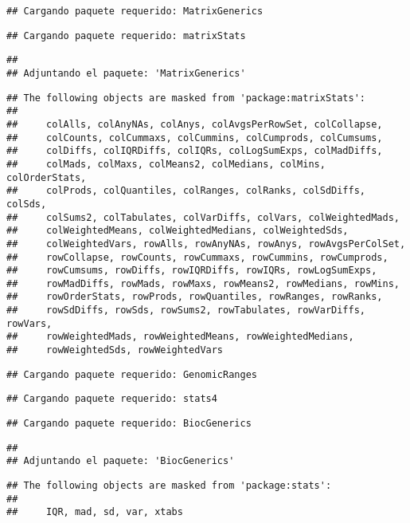 \documentclass[
]{article}
\begin{document}
\begin{verbatim}
## Cargando paquete requerido: MatrixGenerics
\end{verbatim}

\begin{verbatim}
## Cargando paquete requerido: matrixStats
\end{verbatim}

\begin{verbatim}
## 
## Adjuntando el paquete: 'MatrixGenerics'
\end{verbatim}

\begin{verbatim}
## The following objects are masked from 'package:matrixStats':
## 
##     colAlls, colAnyNAs, colAnys, colAvgsPerRowSet, colCollapse,
##     colCounts, colCummaxs, colCummins, colCumprods, colCumsums,
##     colDiffs, colIQRDiffs, colIQRs, colLogSumExps, colMadDiffs,
##     colMads, colMaxs, colMeans2, colMedians, colMins, colOrderStats,
##     colProds, colQuantiles, colRanges, colRanks, colSdDiffs, colSds,
##     colSums2, colTabulates, colVarDiffs, colVars, colWeightedMads,
##     colWeightedMeans, colWeightedMedians, colWeightedSds,
##     colWeightedVars, rowAlls, rowAnyNAs, rowAnys, rowAvgsPerColSet,
##     rowCollapse, rowCounts, rowCummaxs, rowCummins, rowCumprods,
##     rowCumsums, rowDiffs, rowIQRDiffs, rowIQRs, rowLogSumExps,
##     rowMadDiffs, rowMads, rowMaxs, rowMeans2, rowMedians, rowMins,
##     rowOrderStats, rowProds, rowQuantiles, rowRanges, rowRanks,
##     rowSdDiffs, rowSds, rowSums2, rowTabulates, rowVarDiffs, rowVars,
##     rowWeightedMads, rowWeightedMeans, rowWeightedMedians,
##     rowWeightedSds, rowWeightedVars
\end{verbatim}

\begin{verbatim}
## Cargando paquete requerido: GenomicRanges
\end{verbatim}

\begin{verbatim}
## Cargando paquete requerido: stats4
\end{verbatim}

\begin{verbatim}
## Cargando paquete requerido: BiocGenerics
\end{verbatim}

\begin{verbatim}
## 
## Adjuntando el paquete: 'BiocGenerics'
\end{verbatim}

\begin{verbatim}
## The following objects are masked from 'package:stats':
## 
##     IQR, mad, sd, var, xtabs
\end{verbatim}
\end{document}
